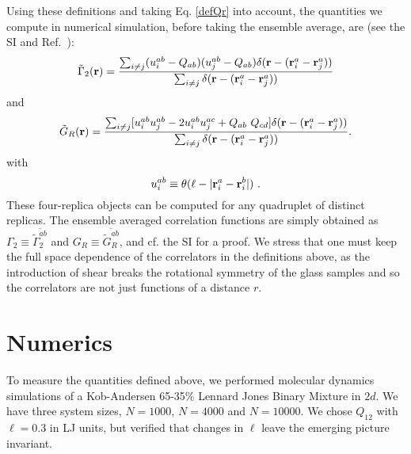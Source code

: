 \documentclass[9pt,twocolumn,twoside]{pnas-new}
\begin{document}
 Using these definitions and taking Eq. \eqref{defQr} into account, the quantities we compute in numerical simulation, before taking the ensemble average, are (see the SI and Ref.~\cite{16BCJPSZ}):
 \begin{equation}
 \tilde \Gamma_2({\bf r}) = \frac{ \sum_{i\neq j}(u^{ab}_i-Q_{ab}) (u^{ab}_j-Q_{ab})\delta({\bf r}-({\bf r}_{i}^a-{\bf r}_{j}^a)) }{ \sum_{i\neq j}\delta({\bf r}-({\bf r}_{i}^a-{\bf r}_{j}^a)) }
 \end{equation}
 and
 \begin{equation}
  \tilde G_R({\bf r})  = \frac{ \sum_{i\neq j}[u_i^{ab}u_j^{ab} - 2u_i^{ab}u_j^{ac} + Q_{ab} ~Q_{cd}]\delta({\bf r}-({\bf r}_{i}^a-{\bf r}_{j}^a)) }{ \sum_{i\neq j}\delta({\bf r}-({\bf r}_{i}^a-{\bf r}_{j}^a)) }.
 \end{equation}
 with
 \begin{equation}
  u^{ab}_i \equiv \theta(\ell-|{\bf r}_i^a-{\bf r}_i^b|) \ .
 \end{equation}
These four-replica objects can be computed for any quadruplet of distinct replicas. The ensemble averaged correlation functions are simply obtained as $\Gamma_2\equiv \overline{\tilde \Gamma^{ab}_2}$ and $G_R\equiv \overline{\tilde G^{ab}_R}$, and cf. the SI for a proof. We stress that one must keep the full space dependence of the correlators in the definitions above, as the introduction of shear breaks the rotational symmetry of the glass samples and so the correlators are not just functions of a distance $r$.

\section*{Numerics}

To measure the quantities defined above, we performed molecular dynamics simulations of a Kob-Andersen 65-35\% Lennard Jones Binary Mixture in $2d$. We have three system sizes, $N=1000$, $N=4000$ and $N=10000$. We chose $Q_{12}$ with $\ell = 0.3$ in LJ units, but verified that changes in $\ell$ leave the emerging picture invariant.
\end{document}
